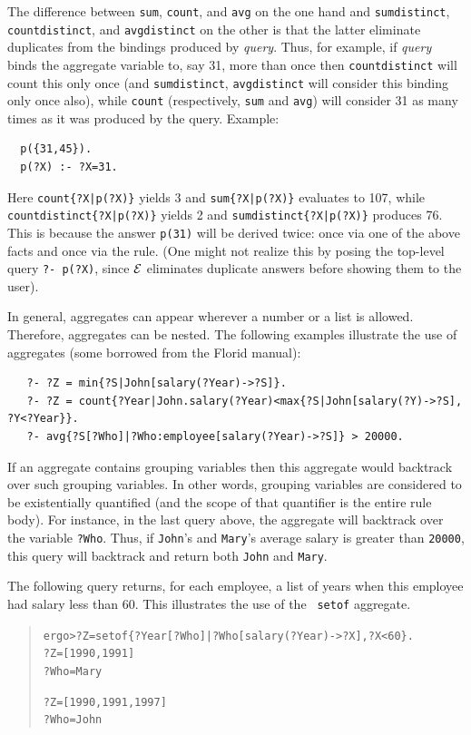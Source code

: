 \documentclass[11pt]{article}
\newcommand{\ERGO}{\mbox{\ensuremath{\cal{E}}\smaller{{\sc{RGO}}}}\xspace}
\newcommand{\FLSYSTEM}{\ERGO}
\newcommand{\prompt}{ergo> }
\newcommand{\FLORID}{{\mbox{\sc Florid}}\xspace}
\begin{document}
The difference between \texttt{sum}, \texttt{count}, and \texttt{avg} on
the one hand and \texttt{sumdistinct}, \texttt{countdistinct}, and
\texttt{avgdistinct} on the other is that the latter eliminate duplicates
from the bindings produced by \textit{query}. Thus, for example, if
\textit{query} binds the aggregate variable to, say 31, more than once then
\texttt{countdistinct} will count this only once (and \texttt{sumdistinct},
\texttt{avgdistinct} will consider this binding only once also), while   
\texttt{count} (respectively, \texttt{sum} and \texttt{avg}) will consider    
31 as many times as it was produced by the query. Example:
\begin{verbatim}
  p({31,45}).
  p(?X) :- ?X=31.
\end{verbatim}
Here \texttt{count\{?X|p(?X)\}} yields 3 and \texttt{sum\{?X|p(?X)\}}
evaluates to 107, while \texttt{countdistinct\{?X|p(?X)\}} yields 2 and
\texttt{sumdistinct\{?X|p(?X)\}} produces 76.  This is because the answer
\texttt{p(31)} will be derived twice: once via one of the above facts and
once via the rule. (One might not realize this by posing the top-level
query \texttt{?- p(?X)}, since \FLSYSTEM eliminates duplicate answers
before showing them to the user).

In general, aggregates can appear wherever a number or a list is
allowed. Therefore, aggregates can be nested. The following examples
illustrate the use of aggregates (some borrowed from the \FLORID manual):
\begin{verbatim}
   ?- ?Z = min{?S|John[salary(?Year)->?S]}.
   ?- ?Z = count{?Year|John.salary(?Year)<max{?S|John[salary(?Y)->?S], ?Y<?Year}}.
   ?- avg{?S[?Who]|?Who:employee[salary(?Year)->?S]} > 20000. 
\end{verbatim}
If an aggregate contains grouping variables 
then this aggregate would backtrack over such
grouping variables. In other words, grouping variables are considered to be
existentially quantified (and the scope of that quantifier is
the entire rule body).
For instance, in the last query above, the
aggregate will backtrack over the variable {\tt ?Who}. Thus, if
{\tt John}'s and {\tt Mary}'s average salary is greater than {\tt 20000},
this query will backtrack and return both {\tt John} and {\tt Mary}.

The following query returns, for each employee, a list of years when this
employee had salary less than 60. This illustrates the use of the {\tt
  setof} aggregate.
\begin{quote}
\begin{alltt}
\prompt ?Z = setof\{?Year[?Who]|?Who[salary(?Year)->?X], ?X < 60\}.
?Z = [1990,1991]
?Who = Mary

?Z = [1990,1991,1997]
?Who = John
\end{alltt}
\end{quote}
\end{document}
